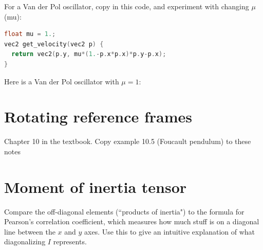 \documentclass{article}
\begin{document}
For a Van der Pol oscillator, copy in this code, and experiment with changing $\mu$ (mu):
\begin{lstlisting}[language=C,frame=single]
float mu = 1.;
vec2 get_velocity(vec2 p) {
  return vec2(p.y, mu*(1.-p.x*p.x)*p.y-p.x);
}
\end{lstlisting}
Here is a Van der Pol oscillator with $\mu = 1$:

\section{Rotating reference frames}
Chapter 10 in the textbook. Copy example 10.5 (Foucault pendulum) to these notes

\section{Moment of inertia tensor}
Compare the off-diagonal elements (``products of inertia") to the formula for Pearson's correlation coefficient, which measures how much stuff is on a diagonal line between the $x$ and $y$ axes. Use this to give an intuitive explanation of what diagonalizing $I$ represents.
\end{document}
